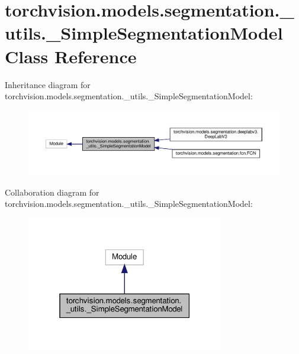 \hypertarget{classtorchvision_1_1models_1_1segmentation_1_1__utils_1_1__SimpleSegmentationModel}{}\section{torchvision.\+models.\+segmentation.\+\_\+utils.\+\_\+\+Simple\+Segmentation\+Model Class Reference}
\label{classtorchvision_1_1models_1_1segmentation_1_1__utils_1_1__SimpleSegmentationModel}


Inheritance diagram for torchvision.\+models.\+segmentation.\+\_\+utils.\+\_\+\+Simple\+Segmentation\+Model\+:
\nopagebreak
\begin{figure}[H]
\begin{center}
\leavevmode
\includegraphics[width=350pt]{classtorchvision_1_1models_1_1segmentation_1_1__utils_1_1__SimpleSegmentationModel__inherit__graph}
\end{center}
\end{figure}


Collaboration diagram for torchvision.\+models.\+segmentation.\+\_\+utils.\+\_\+\+Simple\+Segmentation\+Model\+:
\nopagebreak
\begin{figure}[H]
\begin{center}
\leavevmode
\includegraphics[width=244pt]{classtorchvision_1_1models_1_1segmentation_1_1__utils_1_1__SimpleSegmentationModel__coll__graph}
\end{center}
\end{figure}
